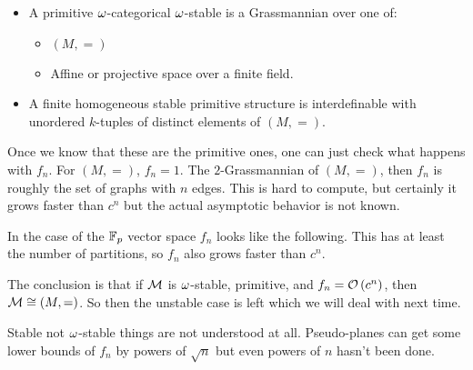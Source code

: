 \documentclass{amsart}
\begin{document}
\begin{fact}

\begin{itemize}
\item A primitive $\omega$-categorical $\omega$-stable is a Grassmannian over one of:
\begin{itemize}
\item $\left(M , =\right)$ 
\item Affine or projective space over a finite field.
\end{itemize}
\item A finite homogeneous stable primitive structure is interdefinable with unordered
$k$-tuples of distinct elements of $\left(M , =\right)$.
\end{itemize}
\end{fact}

Once we know that these are the primitive ones, one can just check what happens with
$f_n$. For $\left(M , =\right)$, $f_n = 1$. The $2$-Grassmannian of $\left(M , =\right)$,
then $f_n$ is roughly the set of graphs with $n$ edges. 
This is hard to compute, but certainly it grows faster than $c^n$ but the actual
asymptotic behavior is not known.

In the case of the $\mathbb{F}_p$ vector space $f_n$ looks like the following. 
This has at least the number of partitions, so $f_n$ also grows faster than $c^n$.

The conclusion is that if $\mathcal{M}$ is $\omega$-stable, primitive, and $f_n = \mathcal{O}\left(c^n\right)$,
then $\mathcal{M} \cong \left(M , =\right)$.
So then the unstable case is left which we will deal with next time. 

Stable not $\omega$-stable things are not understood at all.
Pseudo-planes can get some lower bounds of $f_n$ by powers of $\sqrt{n}$
but even powers of $n$ hasn't been done. 
\end{document}
